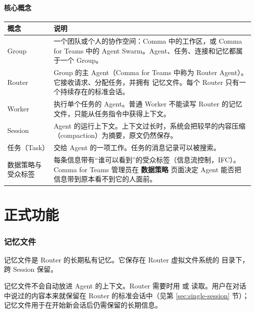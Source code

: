 \documentclass[UTF8,a4paper,11pt]{ctexart}
\begin{document}
\subsection{核心概念}

\begin{longtable}{P{3.2cm}P{10.6cm}}
\toprule
概念 & 说明 \\
\midrule
\endhead
Group & 一个团队或个人的协作空间：Comma 中的工作区，或 Comma for Teams 中的 Agent Swarm。Agent、任务、连接和记忆都属于一个 Group。 \\
Router & Group 的主 Agent（Comma for Teams 中称为 Router Agent）。它接收请求、分配任务，并拥有  记忆文件。每个 Router 只有一个持续存在的标准会话。 \\
Worker & 执行单个任务的 Agent。普通 Worker 不能读写 Router 的记忆文件，只能从任务指令中获得上下文。 \\
Session & Agent 的运行上下文。上下文过长时，系统会把较早的内容压缩（compaction）为摘要，原文仍然保存。 \\
任务（Task） & 交给 Agent 的一项工作。任务的消息记录可以被搜索。 \\
数据策略与受众标签 & 每条信息带有“谁可以看到”的受众标签（信息流控制，IFC）。Comma for Teams 管理员在 \textbf{数据策略} 页面决定 Agent 能否把信息带到原本看不到它的人面前。 \\
\bottomrule
\end{longtable}


\clearpage
\part{正式功能}

\section{记忆文件}

记忆文件是 Router 的长期私有记忆。它保存在 Router 虚拟文件系统的  目录下，跨 Session 保留。

\begin{warn}[记忆不会自动加载]
记忆文件不会自动放进 Agent 的上下文。Router 需要时用  或  读取。用户在对话中说过的内容本来就保留在 Router 的标准会话中（见第 \ref{sec:single-session} 节）；记忆文件用于在开始新会话后仍需保留的长期信息。
\end{warn}
\end{document}
